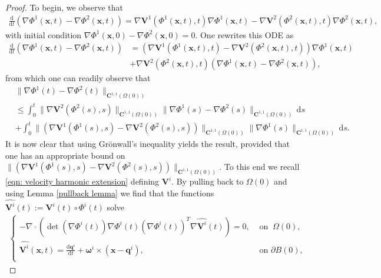 \documentclass[a4paper]{amsart}
\numberwithin{equation}{section}
\newcommand{\grad}{\nabla}
\newcommand{\Div}{\nabla \cdot}
\theoremstyle{plain}
\newcommand{\mbf}[1]{\mathbf{#1}}
\begin{document}
\begin{proof}
	To begin, we observe that
	\begin{gather*}
		\frac{\mathrm{d}}{\mathrm{d}t}(\grad \Phi^1(\mbf{x},t) - \grad \Phi^2(\mbf{x},t)) = \grad\mbf{V}^1(\Phi^1(\mbf{x},t),t) \grad \Phi^1(\mbf{x},t) - \grad\mbf{V}^2(\Phi^2(\mbf{x},t),t) \grad \Phi^2(\mbf{x},t),
	\end{gather*}
	with initial condition $\grad \Phi^1(\mbf{x},0) - \grad \Phi^2(\mbf{x},0) = 0$.
	One rewrites this ODE as
	\begin{align*}
		\frac{\mathrm{d}}{\mathrm{d}t}(\grad \Phi^1(\mbf{x},t) - \grad \Phi^2(\mbf{x},t)) &= (\grad\mbf{V}^1(\Phi^1(\mbf{x},t),t) - \grad\mbf{V}^2(\Phi^2(\mbf{x},t),t)) \grad \Phi^1(\mbf{x},t)\\
		&+ \grad\mbf{V}^2(\Phi^2(\mbf{x},t),t) (\grad \Phi^1(\mbf{x},t) -  \grad \Phi^2(\mbf{x},t)),
	\end{align*}
	from which one can readily observe that
	\begin{equation}
    \begin{aligned}
    &\|\grad \Phi^1(t) - \grad \Phi^2(t)\|_{\mbf{C}^{1,1}(\Omega(0))}\\
        &\leq \int_0^t \|\grad\mbf{V}^2(\Phi^2(s),s)\|_{\mbf{C}^{1,1}(\Omega(0))} \|\grad \Phi^1(s) -  \grad \Phi^2(s)\|_{\mbf{C}^{1,1}(\Omega(0))} \, \mathrm{d}s\\
		&+\int_0^t \|(\grad\mbf{V}^1(\Phi^1(s),s) - \grad\mbf{V}^2(\Phi^2(s),s))\|_{\mbf{C}^{1,1}(\Omega(0))} \|\grad \Phi^1(s)\|_{\mbf{C}^{1,1}(\Omega(0))} \, \mathrm{d}s.
        \end{aligned}\label{jacobian pf1}
	\end{equation}
	It is now clear that using Gr\"onwall's inequality yields the result, provided that one has an appropriate bound on $\|(\grad\mbf{V}^1(\Phi^1(s),s) - \grad\mbf{V}^2(\Phi^2(s),s))\|_{\mbf{C}^{1,1}(\Omega(0))}$.
	To this end we recall \eqref{eqn: velocity harmonic extension} defining $\mbf{V}^i$.
	By pulling back to $\Omega(0)$ and using Lemma \ref{pullback lemma} we find that the functions $\widehat{\mbf{V}^i}(t) := \mbf{V}^i(t)\circ \Phi^i(t)$ solve
	\begin{gather*}
		\begin{cases}
			-\Div \left(\det(\grad\Phi^i(t)) \grad\Phi^i(t) (\grad\Phi^i(t))^{T} \grad \widehat{\mbf{V}^i}(t) \right) = 0,&\text{ on }\ \Omega(0),\\
			\widehat{\mbf{V}^i}(\mbf{x},t) = \frac{\mathrm{d}\mbf{q}^i}{\mathrm{d}t} + \boldsymbol{\omega}^i \times (\mbf{x} - \mbf{q}^i), &\text{ on } \partial B(0),\\

\end{cases}
\end{gather*}
\end{proof}
\end{document}
